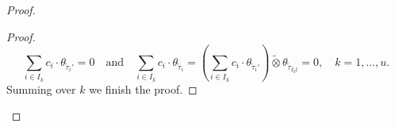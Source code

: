 \documentclass{amsart}
\numberwithin{equation}{section}
\newcommand{\abs}[1]{\left|#1\right|_{F}}
\newcommand{\mrdet}{\operatorname{det}}
\newcommand{\bs}[1]{\boldsymbol{#1}}
\newcommand{\wt}[1]{\widetilde{#1}}
\begin{document}
\begin{proof}
\begin{proof}
			$$\sum_{i\in I_{k}}c_{i}\cdot\theta_{\wt{\tau}_{i}'}=0\quad\text{and}\quad\sum_{i\in I_{k}}c_{i}\cdot\theta_{\wt{\tau}_{i}}=(\sum_{i\in I_{k}}c_{i}\cdot \theta_{\wt{\tau}_{i}'})\wt{\otimes} \theta_{\wt{\tau}_{I_{k}l}}=0,\quad k=1,\dots,u.$$
			Summing over $k$ we finish the proof.
			
		\end{proof}
		

\end{proof}
\end{document}
